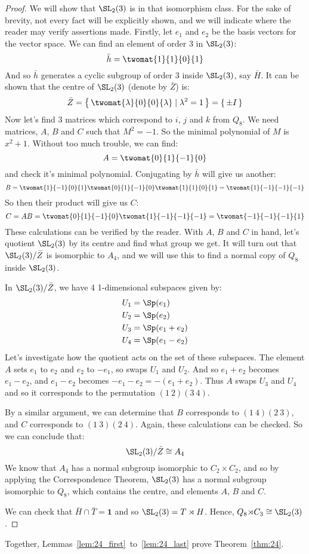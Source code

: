 \begin{proof}
    We will show that \(\SL_2(3)\) is in that isomorphism class.
    For the sake of brevity, not every fact will be explicitly shown, and we will indicate where the reader may verify
    assertions made.
    Firstly, let \(e_1\) and \(e_2\) be the basis vectors for the vector space.
    We can find an element of order 3 in \(\SL_2(3)\):
    \[\bar{h} = \twomat{1}{1}{0}{1}\]
    And so \(\bar{h}\) generates a cyclic subgroup of order 3 inside \(\SL_2(3)\), say \(\bar{H}\).
    It can be shown that the centre of \(\SL_2(3)\) (denote by \(\bar{Z}\)) is:
    \[ \bar{Z} = \left\{\,\twomat{\lambda}{0}{0}{\lambda} \mid \lambda^2 = 1\,\right\} = \{\,\pm I\,\} \]
    Now let's find 3 matrices which correspond to \(i\), \(j\) and \(k\) from \(Q_8\).
    We need matrices, \(A\), \(B\) and \(C\) such that \(M^2 = -1\).
    So the minimal polynomial of \(M\) is \(x^2 + 1\).
    Without too much trouble, we can find:
    \[ A = \twomat{0}{1}{-1}{0} \]
    and check it's minimal polynomial.
    Conjugating by \(\bar{h}\) will give us another:
    \[ B = \twomat{1}{-1}{0}{1}\twomat{0}{1}{-1}{0}\twomat{1}{1}{0}{1} = \twomat{1}{-1}{-1}{-1} \]
    So then their product will give us \(C\):
    \[ C = AB = \twomat{0}{1}{-1}{0}\twomat{1}{-1}{-1}{-1} = \twomat{-1}{-1}{-1}{1} \]
    These calculations can be verified by the reader.
    With \(A\), \(B\) and \(C\) in hand, let's quotient \(\SL_2(3)\) by its centre and find what group we get.
    It will turn out that \(\SL_2(3)/\bar{Z}\) is isomorphic to \(A_4\), and we will use this to find a normal copy of
    \(Q_8\) inside \(\SL_2(3)\).

    In \(\SL_2(3)/\bar{Z}\), we have 4 1-dimensional subspaces given by:
    \begin{align*}
        U_1 &= \Sp(e_1) \\
        U_2 &= \Sp(e_2) \\
        U_3 &= \Sp(e_1 + e_2) \\
        U_4 &= \Sp(e_1 - e_2)
    \end{align*}
    Let's investigate how the quotient acts on the set of these subspaces.
    The element \(A\) sets \(e_1\) to \(e_2\) and \(e_2\) to \(-e_1\), so swaps \(U_1\) and \(U_2\).
    And so \(e_1 + e_2\) becomes \(e_1 - e_2\), and \(e_1 - e_2\) becomes \(-e_1 - e_2 = -(e_1 + e_2)\).
    Thus \(A\) swaps \(U_{3}\) and \(U_4\) and so it corresponds to the permutation \((1\ 2)(3\ 4)\).

    By a similar argument, we can determine that \(B\) corresponds to \((1\ 4)(2\ 3)\), and \(C\) corresponds to
    \((1\ 3)(2\ 4)\).
    Again, these calculations can be checked.
    So we can conclude that:
    \[\SL_2(3)/\bar{Z} \cong A_4\]
    We know that \(A_4\) has a normal subgroup isomorphic to \(C_2 {\times} C_{2}\), and so by applying the
    Correspondence Theorem, \(\SL_2(3)\) has a normal subgroup isomorphic to \(Q_8\), which contains the centre, and
    elements \(A\), \(B\) and \(C\).

    We can check that \(\bar{H} \cap \bar{T} = \bm{1}\) and so \(\SL_2(3) = T \rtimes H\).
    Hence, \(Q_8 {\rtimes} C_3 \cong \SL_2(3)\).
\end{proof}

Together, Lemmas~\ref{lem:24_first}~to~\ref{lem:24_last} prove Theorem~\ref{thm:24}.

